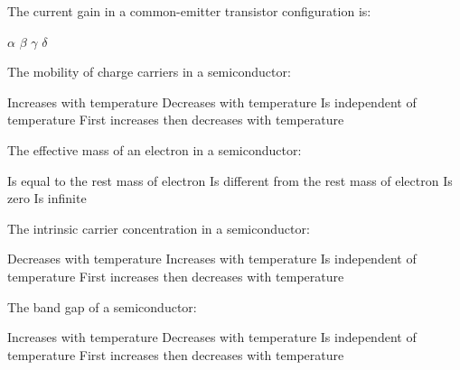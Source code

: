 \begin{question}[2]
The current gain in a common-emitter transistor configuration is:

\begin{oneparcheckboxes}
\choice $\displaystyle \alpha$
\correctchoice $\displaystyle \beta$
\choice $\displaystyle \gamma$
\choice $\displaystyle \delta$
\end{oneparcheckboxes}
\end{question}

\begin{question}[2]
The mobility of charge carriers in a semiconductor:

\begin{oneparcheckboxes}
\choice Increases with temperature
\correctchoice Decreases with temperature
\choice Is independent of temperature
\choice First increases then decreases with temperature
\end{oneparcheckboxes}
\end{question}

\begin{question}[2]
The effective mass of an electron in a semiconductor:

\begin{oneparcheckboxes}
\choice Is equal to the rest mass of electron
\correctchoice Is different from the rest mass of electron
\choice Is zero
\choice Is infinite
\end{oneparcheckboxes}
\end{question}

\begin{question}[2]
The intrinsic carrier concentration in a semiconductor:

\begin{oneparcheckboxes}
\choice Decreases with temperature
\correctchoice Increases with temperature
\choice Is independent of temperature
\choice First increases then decreases with temperature
\end{oneparcheckboxes}
\end{question}

\begin{question}[2]
The band gap of a semiconductor:

\begin{oneparcheckboxes}
\choice Increases with temperature
\correctchoice Decreases with temperature
\choice Is independent of temperature
\choice First increases then decreases with temperature
\end{oneparcheckboxes}
\end{question}

